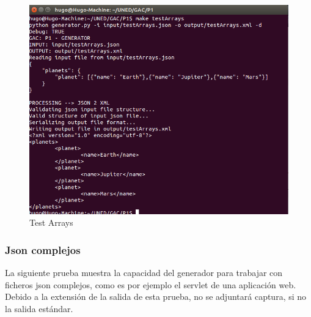 \documentclass[a4paper,11pt]{book}
\begin{document}
\begin{figure}[H]  
\centering 
\includegraphics[scale=0.35]{imagenes/testArrays.png}
\caption{ Test Arrays  }  
\end{figure} 

\subsubsection{Json complejos}
La siguiente prueba muestra la capacidad del generador para trabajar con ficheros json complejos, como es por ejemplo el servlet de una aplicación web. Debido a la extensión de la salida de esta prueba, no se adjuntará captura, si no la salida estándar. 
 
\end{document}
